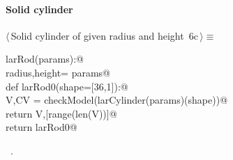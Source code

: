 \documentclass[11pt,oneside]{article}	%
\begin{document}
\paragraph{Solid cylinder}
\begin{flushleft} \small \label{scrap13}
\protect{}$\langle\,$Solid cylinder of given radius and height\nobreak\ {\footnotesize 6c}$\,\rangle\equiv$
\vspace{-1ex}
\begin{list}{}{} \item
\mbox{}\verb@def larRod(params):@\\
\mbox{}\verb@   radius,height= params@\\
\mbox{}\verb@   def larRod0(shape=[36,1]):@\\
\mbox{}\verb@      V,CV = checkModel(larCylinder(params)(shape))@\\
\mbox{}\verb@      return V,[range(len(V))]@\\
\mbox{}\verb@   return larRod0@\\
\mbox{}\verb@@{\NWsep}
\end{list}
\vspace{-1ex}
\footnotesize\addtolength{\baselineskip}{-1ex}
\begin{list}{}{\setlength{\itemsep}{-\parsep}\setlength{\itemindent}{-\leftmargin}}
\item \NWtxtMacroRefIn\ .
\end{list}
\end{flushleft}
\end{document}
